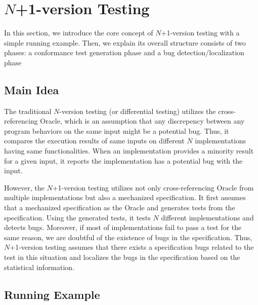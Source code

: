 \section{$N$+1-version Testing}\label{sec:idea}

In this section, we introduce the core concept of $N$+1-version testing with a
simple running example.  Then, we explain its overall structure consists of two
phases: a conformance test generation phase and a bug detection/localization
phase

\subsection{Main Idea}

The traditional $N$-version testing (or differential testing) utilizes the
cross-referencing Oracle, which is an assumption that any discrepency between
any program behaviors on the same input might be a potential bug.  Thus, it
compares the execution results of same inputs on different $N$ implementations
having same functionalities.  When an implementation provides a minority result
for a given input, it reports the implementation has a potential bug with the
input.

However, the $N$+1-version testing utilizes not only cross-referencing Oracle
from multiple implementations but also a mechanized specification.  It first
assumes that a mechanized specification as the Oracle and generates tests from
the specification.  Using the generated tests, it tests $N$ different
implementations and detects bugs.  Moreover, if most of implementations fail to
pass a test for the same reason, we are doubtful of the existence of bugs in
the specification.  Thus, $N$+1-version testing assumes that there exists a
specification bugs related to the test in this situation and localizes the bugs
in the specification based on the statistical information.


\subsection{Running Example}

